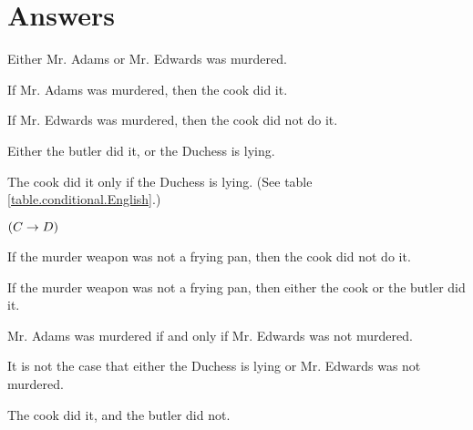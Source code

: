 
\section{Answers}
\setcounter{ProbPart}{0}


\problempart 
\begin{earg}
\item Either Mr. Adams or Mr. Edwards was murdered.
\item[] 
\item If Mr. Adams was murdered, then the cook did it.
\item[] 
\item If Mr. Edwards was murdered, then the cook did not do it.
\item[] 
\item Either the butler did it, or the Duchess is lying.
\item[] 
\item The cook did it only if the Duchess is lying. (See table \ref{table.conditional.English}.) 
\item[] $(C \rightarrow D)$
\item If the murder weapon was not a frying pan, then the cook did not do it.
\item[] 
\item If the murder weapon was not a frying pan, then either the cook or the butler did it.
\item[] 
\item Mr. Adams was murdered if and only if Mr. Edwards was not murdered.
\item[] 
\item It is not the case that either the Duchess is lying or Mr. Edwards was not murdered.
\item[] 
\item The cook did it, and the butler did not.
\item[] 
\end{earg}


